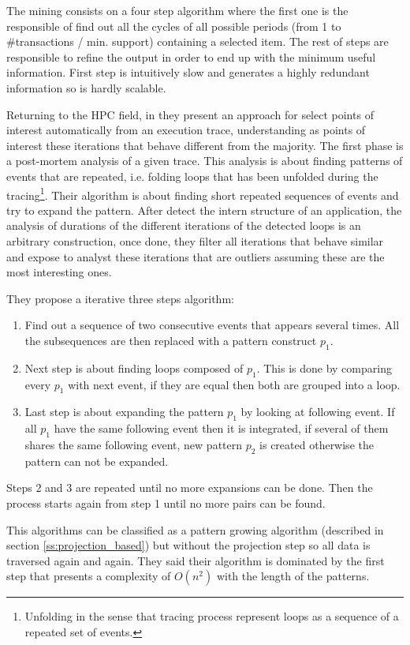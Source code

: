 The mining consists on a four step algorithm where the first one is the
responsible of find out all the cycles of all possible periods (from 1 to \#transactions / min. support) containing a selected item. The rest of steps are
responsible to refine the output in order to end up with the minimum useful
information. First step is intuitively slow and generates a highly redundant
information so is hardly scalable.


Returning to the HPC field, in \cite{trahay2015selecting} they present an 
approach for select points of
interest automatically from an execution trace, understanding as points of 
interest these iterations that
behave different from the majority. The first phase is a post-mortem analysis of
a given trace. This analysis is about finding patterns of events that are
repeated, i.e. folding loops that has been unfolded during the
tracing\footnote{Unfolding in the sense that tracing process represent loops as
a sequence of a repeated set of events.}. Their algorithm is about finding short
repeated sequences of events and try to expand the pattern. After detect the
intern structure of an application, the analysis of durations of the
different iterations of the detected loops is an arbitrary construction, once
done, they filter all iterations that behave similar and
expose to analyst these iterations that are outliers assuming these are the
most interesting ones.

They propose a iterative three steps algorithm:
\begin{enumerate}[label=\roman*)]
  \item Find out a sequence of two consecutive events that appears several
    times. All the subsequences are then replaced with a pattern construct
    $p_{1}$.
  \item Next step is about finding loops composed of $p_{1}$. This is done by
    comparing every $p_{1}$ with next event, if they are equal then both are
    grouped into a loop.
  \item Last step is about expanding the pattern $p_{1}$ by looking at following
    event. If all $p_{1}$ have the same following event then it is integrated,
    if several of them shares the same following event, new pattern $p_{2}$ is
    created otherwise the pattern can not be expanded.
\end{enumerate}
Steps 2 and 3 are repeated until no more expansions can be done. Then the
process starts again from step 1 until no more pairs can be found.

This algorithms can be classified as a pattern growing algorithm (described in
section \ref{ss:projection_based}) but without the projection step so all data
is traversed again and again. They said their algorithm is dominated by the
first step that presents a complexity of $O(n^2)$ with the length of the
patterns.

